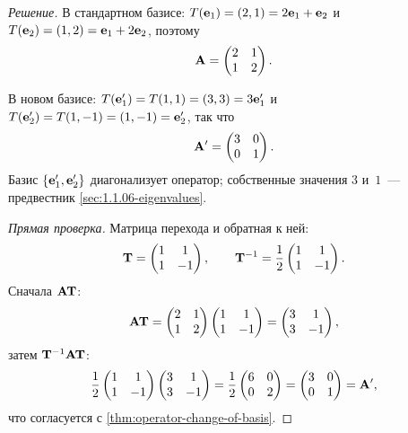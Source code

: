 \begin{proof}[Решение]
В стандартном базисе:
$T(\mathbf{e}_1) = (2, 1) = 2\mathbf{e}_1 + \mathbf{e}_2$ и
$T(\mathbf{e}_2) = (1, 2) = \mathbf{e}_1 + 2\mathbf{e}_2$, поэтому
\[
  \mathbf{A} = \begin{pmatrix} 2 & 1 \\ 1 & 2 \end{pmatrix}.
\]

В новом базисе: $T(\mathbf{e}'_1) = T(1, 1) = (3, 3) = 3\mathbf{e}'_1$ и
$T(\mathbf{e}'_2) = T(1, -1) = (1, -1) = \mathbf{e}'_2$, так что
\[
  \mathbf{A}' = \begin{pmatrix} 3 & 0 \\ 0 & 1 \end{pmatrix}.
\]
Базис $\{\mathbf{e}'_1, \mathbf{e}'_2\}$ диагонализует оператор; собственные
значения $3$ и~$1$~--- предвестник \cref{sec:1.1.06-eigenvalues}.

\emph{Прямая проверка.} Матрица перехода и обратная к ней:
\[
  \mathbf{T} = \begin{pmatrix} 1 & 1 \\ 1 & -1 \end{pmatrix}, \qquad
  \mathbf{T}^{-1} = \frac{1}{2}\begin{pmatrix} 1 & 1 \\ 1 & -1 \end{pmatrix}.
\]
Сначала $\mathbf{A}\mathbf{T}$:
\[
  \mathbf{A}\mathbf{T} = \begin{pmatrix} 2 & 1 \\ 1 & 2 \end{pmatrix}\begin{pmatrix} 1 & 1 \\ 1 & -1 \end{pmatrix}
  = \begin{pmatrix} 3 & 1 \\ 3 & -1 \end{pmatrix},
\]
затем $\mathbf{T}^{-1}\mathbf{A}\mathbf{T}$:
\[
  \frac{1}{2}\begin{pmatrix} 1 & 1 \\ 1 & -1 \end{pmatrix}\begin{pmatrix} 3 & 1 \\ 3 & -1 \end{pmatrix}
  = \frac{1}{2}\begin{pmatrix} 6 & 0 \\ 0 & 2 \end{pmatrix}
  = \begin{pmatrix} 3 & 0 \\ 0 & 1 \end{pmatrix} = \mathbf{A}',
\]
что согласуется с \cref{thm:operator-change-of-basis}.
\end{proof}
